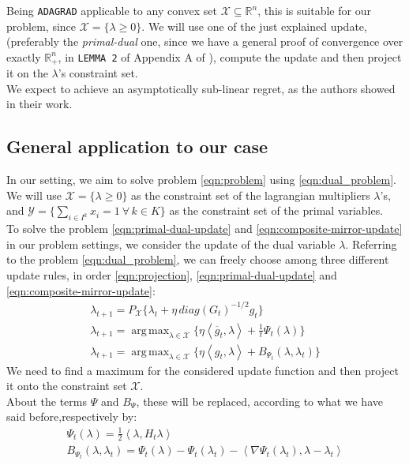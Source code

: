 \documentclass[notitlepage]{article}
\DeclareMathOperator*{\argmax}{arg\,max}
\begin{document}
Being \texttt{ADAGRAD} applicable to any convex set $\mathcal{X} \subseteq \mathbb{R}^n$, this is suitable for our problem, since $\mathcal{X} = \{\lambda \ge 0\}$. We will use one of the just explained update, (preferably 
the \textit{primal-dual} one, since we have a general proof of convergence over exactly $\mathbb{R}_+^n$, in \texttt{LEMMA 2} of Appendix A of \cite{Frangioni2017}), compute the update and then project it on the $\lambda$'s constraint set.\\
We expect to achieve an asymptotically sub-linear regret, as the authors showed in their work.


\subsection{General application to our case}
In our setting, we aim to solve problem \eqref{eqn:problem} using \eqref{eqn:dual_problem}. We will use $\mathcal{X} = \{ \lambda \ge 0 \}$ as the constraint set of the lagrangian multipliers $\lambda$'s, and $\mathcal{Y} = \{ \sum_{i \in I^k} x_i = 1 \ \forall \, k \in K\}$ 
as the constraint set of the primal variables.\\
To solve the problem \eqref{eqn:primal-dual-update} and \eqref{eqn:composite-mirror-update} in our problem settings, we consider the update of the dual variable $\lambda$. Referring to the problem \eqref{eqn:dual_problem}, we can freely choose  
among three different update rules, in order \eqref{eqn:projection}, \eqref{eqn:primal-dual-update} and \eqref{eqn:composite-mirror-update}:
\begin{equation}
  \begin{gathered}
    \lambda_{t+1} = P_{\mathcal{X}} \{ \lambda_t + \eta\, diag(G_t)^{-1/2} g_t \} \\
    \lambda_{t+1} = \argmax_{\lambda \in \mathcal{X}} \{ \eta \left\langle \overline{g}_t,\lambda \right\rangle + \frac{1}{t} \Psi_t(\lambda) \} \\
    \lambda_{t+1} = \argmax_{\lambda \in \mathcal{X}} \{ \eta \left\langle g_t,\lambda \right\rangle + B_{\Psi_t} (\lambda,\lambda_t) \}
    \label{eqn:updates}  
  \end{gathered}
\end{equation}
We need to find a maximum for the considered update function and then project it onto the constraint set $\mathcal{X}$.\\
About the terms $\Psi$ and $B_\Psi$, these will be replaced, according to what we have said before,respectively by:
\begin{gather*}
  \Psi_t(\lambda) = \frac{1}{2} \left\langle \lambda,H_t \lambda \right\rangle \\
  B_{\Psi_t} (\lambda,\lambda_t) = \Psi_t(\lambda) - \Psi_t(\lambda_t) - \left\langle \nabla \Psi_t(\lambda_t),\lambda-\lambda_t \right\rangle
\end{gather*}
\end{document}
